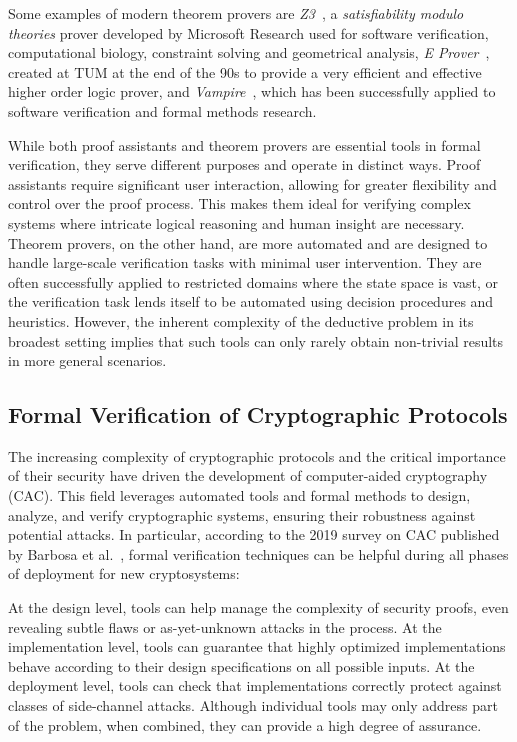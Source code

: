 Some examples of modern theorem provers are \textit{Z3}~\cite{z3}, a \textit{satisfiability modulo theories} prover developed by Microsoft Research used for software verification, computational biology, constraint solving and geometrical analysis, \textit{E Prover}~\cite{eprover}, created at TUM at the end of the 90s to provide a very efficient and effective higher order logic prover, and \textit{Vampire}~\cite{vampire}, which has been successfully applied to software verification and formal methods research.

While both proof assistants and theorem provers are essential tools in formal verification, they serve different purposes and operate in distinct ways. Proof assistants require significant user interaction, allowing for greater flexibility and control over the proof process. This makes them ideal for verifying complex systems where intricate logical reasoning and human insight are necessary. Theorem provers, on the other hand, are more automated and are designed to handle large-scale verification tasks with minimal user intervention. They are often successfully applied to restricted domains where the state space is vast, or the verification task lends itself to be automated using decision procedures and heuristics. However, the inherent complexity of the deductive problem in its broadest setting implies that such tools can only rarely obtain non-trivial results in more general scenarios.

\subsection{Formal Verification of Cryptographic Protocols}
\label{sec:formalverificationcrypto}

The increasing complexity of cryptographic protocols and the critical importance of their security have driven the development of computer-aided cryptography (CAC). This field leverages automated tools and formal methods to design, analyze, and verify cryptographic systems, ensuring their robustness against potential attacks. In particular, according to the 2019 survey on CAC published by Barbosa et al.~\cite{sok}, formal verification techniques can be helpful during all phases of deployment for new cryptosystems:

At the design level, tools can help manage the complexity of security proofs, even revealing subtle flaws or as-yet-unknown attacks in the process. At the implementation level, tools can guarantee that highly optimized implementations behave according to their design specifications on all possible inputs. At the deployment level, tools can check that implementations correctly protect against classes of side-channel attacks. Although individual tools may only address part of the problem, when combined, they can provide a high degree of assurance.

